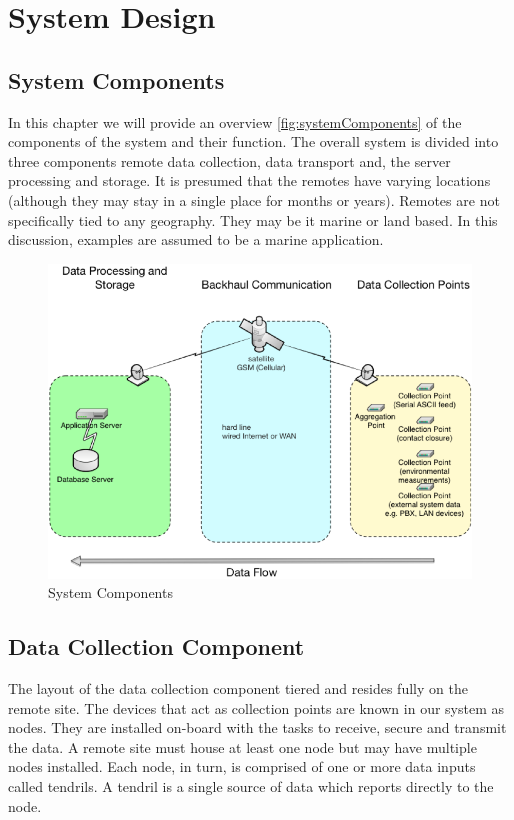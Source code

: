 \chapter{System Design}

\section{System Components}
In this chapter we will provide an overview \autoref{fig:systemComponents} of the components of the system and their function. The overall system is divided into three components remote data collection, data transport and, the server processing and storage.  It is presumed that the remotes have varying locations (although they may stay in a single place for months or years). Remotes are not specifically tied to any geography.  They may be it marine or land based. In this discussion, examples are assumed to be a marine application.  

\begin{figure}
\centering
\includegraphics{Figures/systemComponentOverview}
\caption{System Components}
\label{fig:systemComponents}
\end{figure}

\section{Data Collection Component}

The layout of the data collection component tiered and resides fully on the remote site.  The devices that act as collection points are known in our system as nodes.  They are installed on-board with the tasks to receive, secure and transmit the data.  A remote site must house at least one node but may have multiple nodes installed.  Each node, in turn, is comprised of one or more data inputs called tendrils.  A tendril is a single source of data which reports directly to the node. 

